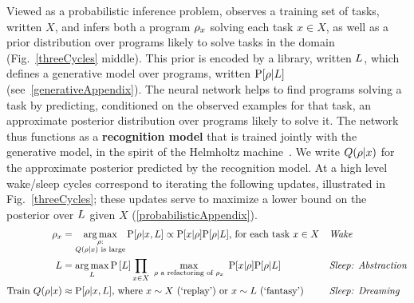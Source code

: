\documentclass[12pt]{article}
\begin{document}
Viewed as a probabilistic inference problem, \system observes a training set of
tasks, written $X$, and infers both a program $\rho_x$ solving each task $x\in X$, as
well as a prior distribution over programs likely to solve tasks in
the domain (Fig.~\ref{threeCycles} middle). This prior is encoded by
a library, written $L$, which %
defines a generative model over programs,
written $\text{P}[\rho|L]$
(see~\ref{generativeAppendix}).
The neural network %
 helps to find programs solving a task by predicting, conditioned on the observed examples for that task, an approximate
posterior distribution over programs likely to solve it. %
The network
thus functions as a \textbf{recognition model} that is trained jointly with the generative model, in the spirit of the Helmholtz machine~\cite{hinton1995wake}.
We write $Q(\rho|x)$ for the approximate
posterior predicted by the recognition model.
At a high level wake/sleep cycles correspond to iterating the following updates, %
 illustrated in Fig.~\ref{threeCycles}; these updates serve to maximize a lower bound  on the posterior over $L$ given $X$ (\ref{probabilisticAppendix}).
\begin{align}
  \program_x &= \argmax_{\substack{\program:\\Q(\program|x)\text{ is large}}} \probability[\program|x,\prior] \propto \probability[x|\program]\probability[\program|\prior]\text{, for each task $x\in X$}&&\text{\emph{Wake}}\nonumber\\%
  \prior &= \argmax_{\prior}\probability\left[\prior \right]\prod_{x\in X}\max_{\phantom{t}\program\text{ a refactoring of }\program_x\phantom{t}}\probability[x|\program]\probability[\program|\prior]&&\text{\emph{Sleep: Abstraction}}\nonumber\\%
\text{Train }  Q(\program|x)&\approx \probability[\program|x,\prior]\text{, where $x\sim X$ (`replay') or $x\sim \prior$ (`fantasy')}&&\text{\emph{Sleep: Dreaming}} \label{threeEquations}%
\end{align}
\end{document}
